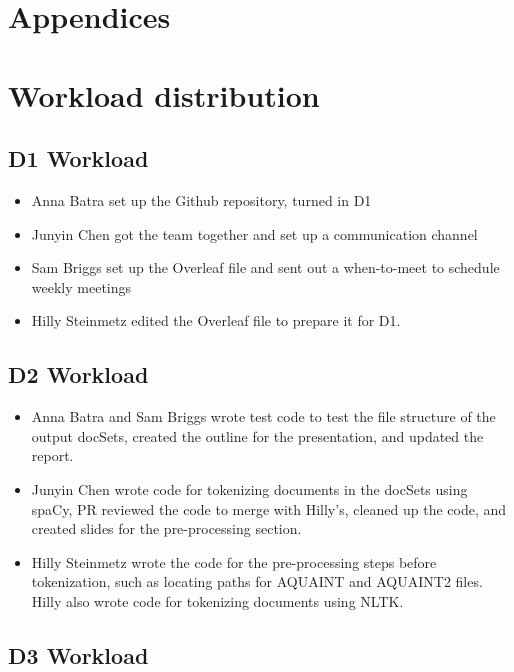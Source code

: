 
\section{Appendices}
\appendix
\section{Workload distribution}

\subsection{D1 Workload}

\begin{itemize}
    \item Anna Batra set up the Github repository, turned in D1
    \item Junyin Chen got the team together and set up a communication channel
    \item Sam Briggs set up the Overleaf file and sent out a when-to-meet to schedule weekly meetings
    \item Hilly Steinmetz edited the Overleaf file to prepare it for D1.
\end{itemize}

\subsection{D2 Workload}

\begin{itemize}
    \item Anna Batra and Sam Briggs wrote test code to test the file structure of the output docSets, created the outline for the presentation, and updated the report.  

    \item Junyin Chen wrote code for tokenizing documents in the docSets using spaCy, PR reviewed the code to merge with Hilly's, cleaned up the code, and created slides for the pre-processing section.

    \item Hilly Steinmetz wrote the code for the pre-processing steps before tokenization, such as locating paths for AQUAINT and AQUAINT2 files. Hilly also wrote code for tokenizing documents using NLTK.
\end{itemize}

\subsection{D3 Workload}

